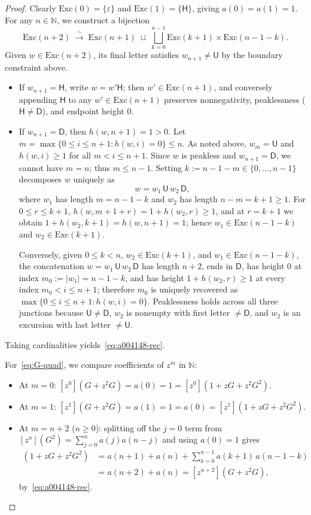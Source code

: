 \documentclass[11pt]{article}
\theoremstyle{definition}
\newcommand{\N}{\mathbb{N}}
\newcommand{\StepU}{\mathsf{U}}
\newcommand{\StepH}{\mathsf{H}}
\newcommand{\StepD}{\mathsf{D}}
\newcommand{\Exc}{\mathrm{Exc}}
\begin{document}
\begin{proof}
Clearly $\Exc(0) = \{\varepsilon\}$ and $\Exc(1) = \{\StepH\}$, giving $a(0) = a(1) = 1$. For any $n \in \N$, we construct a bijection
\[
\Exc(n + 2) \;\xrightarrow{\;\sim\;}\; \Exc(n + 1) \;\sqcup\; \bigsqcup_{k=0}^{n-1} \Exc(k + 1) \times \Exc(n - 1 - k).
\]
Given $w \in \Exc(n+2)$, its final letter satisfies $w_{n+1} \ne \StepU$ by the boundary constraint above.
\begin{itemize}
\item If $w_{n+1} = \StepH$, write $w = w' \StepH$; then $w' \in \Exc(n + 1)$, and conversely appending $\StepH$ to any $w' \in \Exc(n + 1)$ preserves nonnegativity, peaklessness ($\StepH \ne \StepD$), and endpoint height $0$.
\item If $w_{n+1} = \StepD$, then $h(w, n+1) = 1 > 0$. Let $m = \max\{0 \le i \le n+1 : h(w, i) = 0\} \le n$. As noted above, $w_m = \StepU$ and $h(w, i) \ge 1$ for all $m < i \le n+1$. Since $w$ is peakless and $w_{n+1} = \StepD$, we cannot have $m = n$; thus $m \le n - 1$. Setting $k := n - 1 - m \in \{0, \dots, n-1\}$ decomposes $w$ uniquely as
\[
w = w_1 \,\StepU\, w_2 \,\StepD,
\]
where $w_1$ has length $m = n - 1 - k$ and $w_2$ has length $n - m = k + 1 \ge 1$. For $0 \le r \le k + 1$, $h(w, m + 1 + r) = 1 + h(w_2, r) \ge 1$, and at $r = k + 1$ we obtain $1 + h(w_2, k+1) = h(w, n+1) = 1$; hence $w_1 \in \Exc(n - 1 - k)$ and $w_2 \in \Exc(k + 1)$.

Conversely, given $0 \le k < n$, $w_2 \in \Exc(k + 1)$, and $w_1 \in \Exc(n - 1 - k)$, the concatenation $w = w_1\,\StepU\,w_2\,\StepD$ has length $n + 2$, ends in $\StepD$, has height $0$ at index $m_0 := |w_1| = n - 1 - k$, and has height $1 + h(w_2, r) \ge 1$ at every index $m_0 < i \le n + 1$; therefore $m_0$ is uniquely recovered as $\max\{0 \le i \le n+1 : h(w, i) = 0\}$. Peaklessness holds across all three junctions because $\StepU \ne \StepD$, $w_2$ is nonempty with first letter $\ne \StepD$, and $w_2$ is an excursion with last letter $\ne \StepU$.
\end{itemize}
Taking cardinalities yields~\eqref{eq:a004148-rec}.

For~\eqref{eq:G-quad}, we compare coefficients of $z^m$ in $\N$:
\begin{itemize}
\item At $m = 0$: $[z^0](G + z^2 G) = a(0) = 1 = [z^0](1 + z G + z^2 G^2)$.
\item At $m = 1$: $[z^1](G + z^2 G) = a(1) = 1 = a(0) = [z^1](1 + z G + z^2 G^2)$.
\item At $m = n + 2$ ($n \ge 0$): splitting off the $j = 0$ term from $[z^n](G^2) = \sum_{j=0}^n a(j) a(n - j)$ and using $a(0) = 1$ gives
\begin{align*}
[z^{n+2}](1 + z G + z^2 G^2)
  &= a(n+1) + a(n) + \sum_{k=0}^{n-1} a(k+1)\,a(n-1-k) \\
  &= a(n+2) + a(n) = [z^{n+2}](G + z^2 G),
\end{align*}
by~\eqref{eq:a004148-rec}. \qedhere
\end{itemize}
\end{proof}
\end{document}
